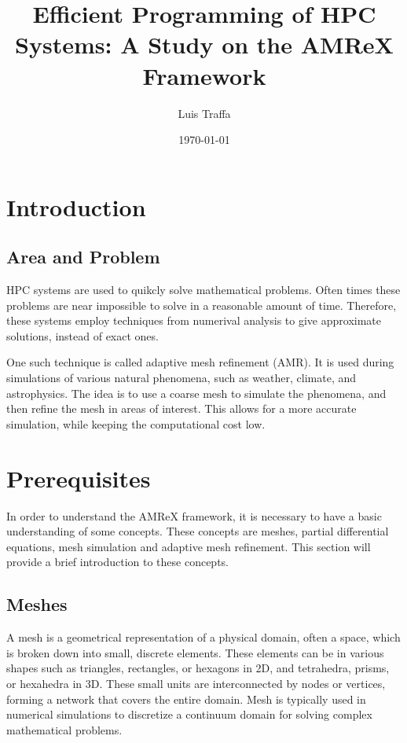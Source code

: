 \documentclass[12pt, a4paper]{scrartcl}
\title{Efficient Programming of HPC Systems: A Study on the AMReX Framework}
\author{Luis Traffa}
\date{\today}
\begin{document}
\maketitle
\clearpage

\tableofcontents
\clearpage

\section{Introduction}
\subsection{Area and Problem}

HPC systems are used to quikcly solve mathematical problems. Often times 
these problems are near impossible to solve in a reasonable amount of time.
Therefore, these systems employ techniques from numerival analysis to give approximate solutions,
instead of exact ones. 

One such technique is called adaptive mesh refinement (AMR). It is used during simulations of various natural 
phenomena, such as weather, climate, and astrophysics. The idea is to use a coarse mesh to simulate the
phenomena, and then refine the mesh in areas of interest. This allows for a more accurate simulation, while
keeping the computational cost low.

\section{Prerequisites}

In order to understand the AMReX framework, it is necessary to have a basic understanding of some concepts. 
These concepts are meshes, partial differential equations, mesh simulation and adaptive mesh refinement.
This section will provide a brief introduction to these concepts.

\subsection{Meshes}

A mesh is a geometrical representation of a physical domain, often a space, 
which is broken down into small, discrete elements. These elements can be in various shapes 
such as triangles, rectangles, or hexagons in 2D, and tetrahedra, prisms, or hexahedra in 3D. 
These small units are interconnected by nodes or vertices, forming a network that covers the 
entire domain. Mesh is typically used in numerical simulations to 
discretize a continuum domain for solving complex mathematical problems.
\end{document}
